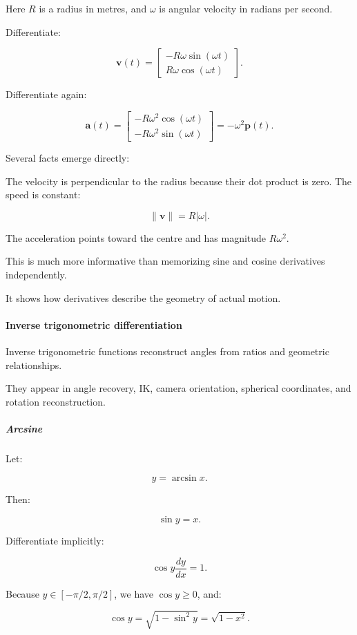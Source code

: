 Here \(R\) is a radius in metres, and \(\omega\) is angular velocity in radians per second.

Differentiate:

\[
\mathbf v(t)= \begin{bmatrix} -R\omega\sin(\omega t)\\ R\omega\cos(\omega t) \end{bmatrix}.
\]

Differentiate again:

\[
\mathbf a(t)= \begin{bmatrix} -R\omega^2\cos(\omega t)\\ -R\omega^2\sin(\omega t) \end{bmatrix} =-\omega^2\mathbf p(t).
\]

Several facts emerge directly:

The velocity is perpendicular to the radius because their dot product is zero. The speed is constant:

\[
\|\mathbf v\|=R|\omega|.
\]

The acceleration points toward the centre and has magnitude \(R\omega^2\).

This is much more informative than memorizing sine and cosine derivatives independently.

It shows how derivatives describe the geometry of actual motion.

\paragraph{Inverse trigonometric differentiation}\label{01-foundations-i-ch020-inverse-trigonometric-differentiation}

Inverse trigonometric functions reconstruct angles from ratios and geometric relationships.

They appear in angle recovery, IK, camera orientation, spherical coordinates, and rotation reconstruction.

\subparagraph{Arcsine}\label{01-foundations-i-ch020-arcsine}

Let:

\[
y=\arcsin x.
\]

Then:

\[
\sin y=x.
\]

Differentiate implicitly:

\[
\cos y\frac{dy}{dx}=1.
\]

Because \(y\in[-\pi/2,\pi/2]\), we have \(\cos y\ge0\), and:

\[
\cos y=\sqrt{1-\sin^2y}=\sqrt{1-x^2}.
\]

